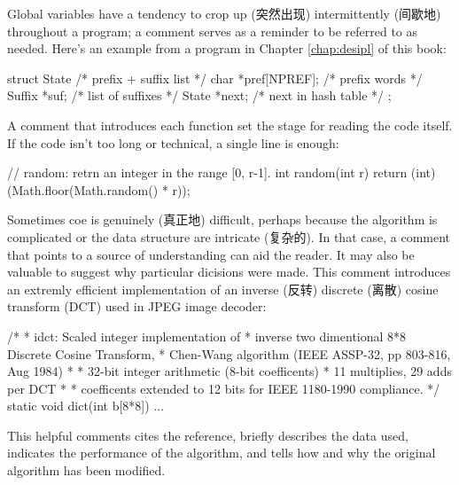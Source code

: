 Global variables have a tendency to crop up (突然出现) intermittently
(间歇地) throughout a program; a comment serves as a reminder to be
referred to as needed. Here's an example from a program in Chapter
\ref{chap:desipl} of this book:
\begin{wellcode}
    struct State { /* prefix + suffix list */
        char    *pref[NPREF];   /* prefix words */
        Suffix  *suf;           /* list of suffixes */
        State   *next;          /* next in hash table */
    };
\end{wellcode}
A comment that introduces each function set the stage for reading the code
itself. If the code isn't too long or technical, a single line is enough:
\begin{wellcode}
    // random: retrn an integer in the range [0, r-1].
    int random(int r)
    {
        return (int)(Math.floor(Math.random() * r));
    }
\end{wellcode}
Sometimes coe is genuinely (真正地) difficult, perhaps because the
algorithm is complicated or the data structure are intricate (复杂的). In
that case, a comment that points to a source of understanding can aid the
reader. It may also be valuable to suggest why particular dicisions were
made. This comment introduces an extremly efficient implementation of an
inverse (反转) discrete (离散) cosine transform (DCT) used in JPEG image
decoder:
\begin{wellcode}
    /*
     * idct: Scaled integer implementation of 
     * inverse two dimentional 8*8 Discrete Cosine Transform,
     * Chen-Wang algorithm (IEEE ASSP-32, pp 803-816, Aug 1984)
     *
     * 32-bit integer arithmetic (8-bit coefficents)
     * 11 multiplies, 29 adds per DCT
     *
     * coefficents extended to 12 bits for IEEE 1180-1990 compliance.
     */
     static void dict(int b[8*8])
     {
         ...
     }
\end{wellcode}
This helpful comments cites the reference, briefly describes the data used,
indicates the performance of the algorithm, and tells how and why the
original algorithm has been modified.

